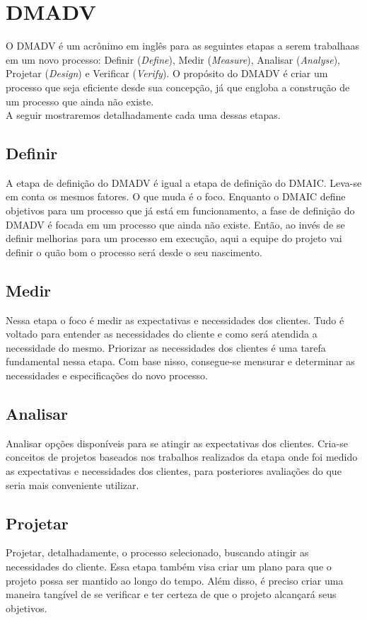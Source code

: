 \documentclass{abnt}
\begin{document}
			\section {DMADV}
				O DMADV é um acrônimo em inglês para as seguintes etapas a serem trabalhaas em um 
				novo processo: Definir (\textit{Define}), Medir (\textit{Measure}), 
				Analisar (\textit{Analyse}), Projetar (\textit{Design}) e Verificar (\textit{Verify}).
				O propósito do DMADV é criar um processo que seja eficiente desde sua concepção, já que engloba a 
				construção de um processo que ainda não existe.
				\\
				A seguir mostraremos detalhadamente cada uma dessas etapas.
				\subsection {Definir}
				A etapa de definição do DMADV é igual a etapa de definição do DMAIC. Leva-se em conta os mesmos fatores.
				O que muda é o foco. Enquanto o DMAIC define objetivos para um processo que já está em funcionamento, 
				a fase de definição do DMADV é focada em um processo que ainda não existe. Então, ao invés de se definir 
				melhorias para um processo em execução, aqui a equipe do projeto vai definir o quão bom o processo será desde 
				o seu nascimento.
				\subsection {Medir}
				Nessa etapa o foco é medir as expectativas e necessidades dos clientes. Tudo é voltado para 
				entender as necessidades do cliente e como será atendida a necessidade do mesmo.
				Priorizar as necessidades dos clientes é uma tarefa fundamental nessa etapa.
				Com base nisso, consegue-se mensurar e determinar as necessidades e especificações do novo processo.
				\subsection {Analisar}
				Analisar opções disponíveis para se atingir as expectativas dos clientes. Cria-se conceitos de projetos baseados 
				nos trabalhos realizados da etapa onde foi medido as expectativas e necessidades dos clientes, 
				para posteriores avaliações do que seria mais conveniente utilizar.
				\subsection {Projetar}
				Projetar, detalhadamente, o processo selecionado, buscando atingir as necessidades do cliente. 
				Essa etapa também visa criar um plano para que o projeto possa ser mantido ao longo do tempo. Além disso, 
				é preciso criar uma maneira tangível de se verificar e ter certeza de que o projeto alcançará seus objetivos.
\end{document}
